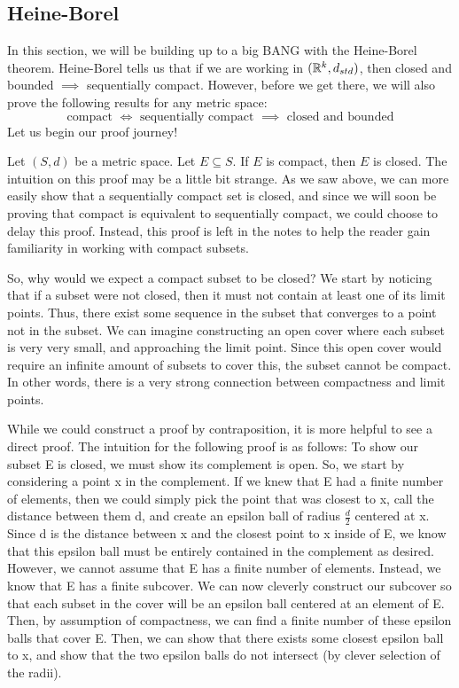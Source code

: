 \subsection{Heine-Borel}
In this section, we will be building up to a big BANG with the Heine-Borel theorem. Heine-Borel tells us that if we are working in \(({\mathbb R}^k, d_{std})\), then closed and bounded \(\implies\) sequentially compact. However, before we get there, we will also prove the following results for any metric space:
	\begin{equation*}
  		\textrm{compact \(\iff\) sequentially compact \(\implies\) closed and bounded}
	\end{equation*}
Let us begin our proof journey!
\begin{thm}{}{}
Let \((S, d)\) be a metric space. Let \(E \subseteq S\). \newline 
If \(E\) is compact, then \(E\) is closed.\newline
The intuition on this proof may be a little bit strange. As we saw above, we can more easily show that a sequentially compact set is closed, and since we will soon be proving that compact is equivalent to sequentially compact, we could choose to delay this proof. Instead, this proof is left in the notes to help the reader gain familiarity in working with compact subsets. \newline 

So, why would we expect a compact subset to be closed? We start by noticing that if a subset were not closed, then it must not contain at least one of its limit points. Thus, there exist some sequence in the subset that converges to a point not in the subset. We can imagine constructing an open cover where each subset is very very small, and approaching the limit point. Since this open cover would require an infinite amount of subsets to cover this, the subset cannot be compact. In other words, there is a very strong connection between compactness and limit points.\newline 

While we could construct a proof by contraposition, it is more helpful to see a direct proof. The intuition for the following proof is as follows: To show our subset E is closed, we must show its complement is open. So, we start by considering a point x in the complement. If we knew that E had a finite number of elements, then we could simply pick the point that was closest to x, call the distance between them d, and create an epsilon ball of radius \(\frac{d}{2}\) centered at x. Since d is the distance between x and the closest point to x inside of E, we know that this epsilon ball must be entirely contained in the complement as desired. However, we cannot assume that E has a finite number of elements. Instead, we know that E has a finite subcover. We can now cleverly construct our subcover so that each subset in the cover will be an epsilon ball centered at an element of E. Then, by assumption of compactness, we can find a finite number of these epsilon balls that cover E. Then, we can show that there exists some closest epsilon ball to x, and show that the two epsilon balls do not intersect (by clever selection of the radii). \newline 


\end{thm}
